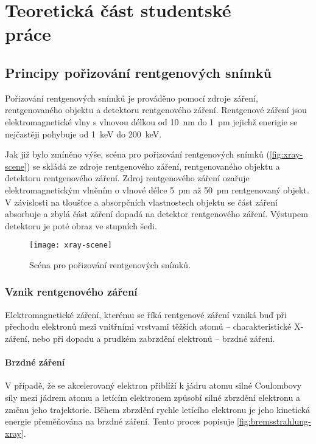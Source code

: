 \chapter[Teoretická část studentské práce]{Teoretická část studentské\\ práce}

\section{Principy pořizování rentgenových snímků}
\label{sec:principy}
Pořizování rentgenových snímků je prováděno pomocí zdroje \zk záření, rentgenovaného objektu a detektoru rentgenového záření. Rentgenové záření jsou elektromagnetické vlny s vlnovou délkou od \SI{10}{\nano\meter} do \SI{1}{\pico\meter} jejichž enerigie se nejčastěji pohybuje od \SI{1}{\kilo\eV} do \SI{200}{\kilo\eV}. \cite{AstroNuklFyzika-JadRadFyzika}

Jak již bylo zmíněno výše, scéna pro pořizování rentgenových snímků (\cref{fig:xray-scene}) se skládá ze zdroje rentgenového záření, rentgenovaného objektu a detektoru rentgenového záření. Zdroj rentgenového záření ozařuje elektromagnetickým vlněním o vlnové délce \SI{5}{\pico\meter} až \SI{50}{\pico\meter} rentgenovaný objekt. V závislosti na tloušťce a absorpčních vlastnostech objektu se část záření absorbuje a zbylá část záření dopadá na detektor rentgenového záření. Výstupem detektoru je poté obraz ve stupních šedi. \cite[kap.~3.2]{AstroNuklFyzika-JadRadMetody}

\begin{figure}[bh]
\texttt{[image: xray-scene]}
\caption{Scéna pro pořizování rentgenových snímků.}
\label{fig:x-ray-scene}
\centering
\end{figure}

\subsection{Vznik rentgenového záření}
\label{sec:vznik-rentgenoveho-zareni}
Elektromagnetické záření, kterému se říká rentgenové záření vzniká buď při přechodu elektronů mezi vnitřními vrstvami těžších atomů -- charakteristické X-záření, nebo při dopadu a prudkém zabrzdění elektronů -- brzdné záření. \cite{AstroNuklFyzika-JadRadFyzika}

\subsubsection{Brzdné záření}
V případě, že se akcelerovaný elektron přiblíží k jádru atomu silné Coulombovy síly mezi jádrem atomu a letícím elektronem způsobí silné zbrzdění elektronu a změnu jeho trajektorie. Během zbrzdění rychle letícího elektronu  je jeho kinetická energie přeměňována na brzdné záření. \cite[str.~89]{Diagnostic-Radiology-Physics} Tento proces popisuje \cref{fig:bremsstrahlung-xray}.

